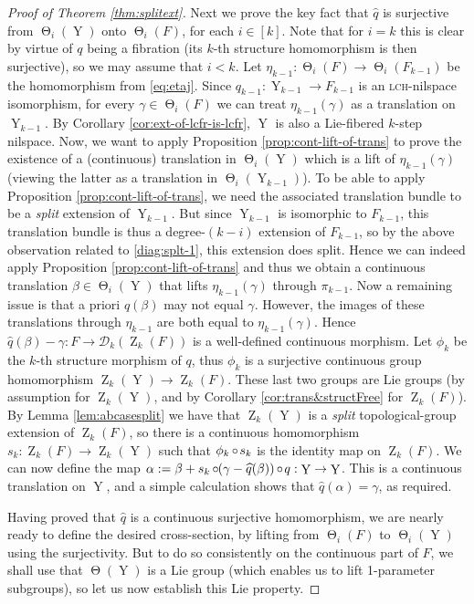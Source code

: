 \documentclass[a4paper,12pt,reqno]{amsart}
\theoremstyle{definition}
\def\to{\rightarrow}
\newcommand{\mc}{\mathcal}
\newcommand{\wh}{\widehat}
\DeclareMathOperator{\ab}{Z}
\DeclareMathOperator{\tran}{\Theta}
\DeclareMathOperator{\nss}{Y}
\DeclareMathOperator{\co}{\circ\hspace{-0.02 cm}}
\begin{document}
\begin{proof}[Proof of Theorem \ref{thm:splitext}]
Next we prove the key fact that $\wh{q}$ is surjective from $\tran_i(\nss)$ onto $\tran_i(F)$, for each $i\in [k]$. Note that for $i=k$ this is clear by virtue of $q$ being a fibration (its $k$-th structure homomorphism is then surjective), so we may assume that $i<k$. Let $\eta_{k-1}:\tran_i(F)\to\tran_i(F_{k-1})$ be the homomorphism from \eqref{eq:etaj}. Since $q_{k-1}:\nss_{k-1}\to F_{k-1}$ is an \textsc{lch}-nilspace isomorphism, for every $\gamma\in \tran_i(F)$ we can treat $\eta_{k-1}(\gamma)$ as a translation on $\nss_{k-1}$. By Corollary \ref{cor:ext-of-lcfr-is-lcfr}, $\nss$ is also a Lie-fibered $k$-step nilspace. Now, we want to apply Proposition \ref{prop:cont-lift-of-trans} to prove the existence of a (continuous) translation in $\tran_i(\nss)$ which is a lift of $\eta_{k-1}(\gamma)$ (viewing the latter as a translation in $\tran_i(\nss_{k-1})$). To be able to apply Proposition \ref{prop:cont-lift-of-trans}, we need the associated translation bundle to be a \emph{split} extension of $\nss_{k-1}$. But since $\nss_{k-1}$ is isomorphic to $F_{k-1}$, this translation bundle is thus a degree-$(k-i)$ extension of $F_{k-1}$, so by the above observation related to \eqref{diag:splt-1}, this extension does split. Hence we can indeed apply Proposition \ref{prop:cont-lift-of-trans} and thus we obtain a continuous translation $\beta\in \tran_i(\nss)$ that lifts $\eta_{k-1}(\gamma)$ through $\pi_{k-1}$. Now a remaining issue is that a priori $\wh{q}(\beta)$ may not equal $\gamma$. However, the images of these translations through $\eta_{k-1}$ are both equal to $\eta_{k-1}(\gamma)$. Hence $\wh{q}(\beta)-\gamma:F\to \mc{D}_k(\ab_k(F))$ is a well-defined continuous morphism. Let $\phi_k$ be the $k$-th structure morphism of $q$, thus $\phi_k$ is a surjective continuous group homomorphism $\ab_k(\nss)\to \ab_k(F)$. These last two groups are Lie groups (by assumption for $\ab_k(\nss)$, and by Corollary \ref{cor:trans&structFree} for $\ab_k(F)$). By Lemma \ref{lem:abcasesplit} we have that $\ab_k(\nss)$ is a \emph{split} topological-group extension of $\ab_k(F)$, so there is a continuous homomorphism $s_k:\ab_k(F)\to  \ab_k(\nss)$ such that $\phi_k\co s_k$ is the identity map on $\ab_k(F)$. We can now define the map $\alpha:=\beta+s_k\co(\gamma-\wh{q}(\beta))\co q:\nss\to\nss$. This is a continuous translation on $\nss$, and a simple calculation shows that  $\wh{q}(\alpha)=\gamma$, as required.

Having proved that $\wh{q}$ is a continuous surjective homomorphism, we are nearly ready to define the desired cross-section, by lifting from $\tran_i(F)$ to $\tran_i(\nss)$ using the surjectivity. But to do so consistently on the continuous part of $F$, we shall use that $\tran(\nss)$ is a Lie group (which enables us to lift 1-parameter subgroups), so let us now establish this Lie property.


\end{proof}
\end{document}
